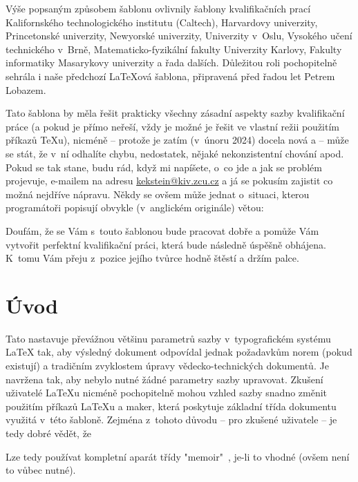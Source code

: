 \documentclass[czech, ma, kiv, he, iso690alph, pdf, viewonly]{fasthesis}
\begin{document}
Výše popsaným způsobem šablonu ovlivnily šablony kvalifikačních prací Kalifornského technologického institutu (Caltech), Harvardovy univerzity, Princetonské univerzity, Newyorské univerzity, Univerzity v~Oslu, Vysokého učení technického v~Brně, Matematicko-fyzikální fakulty Univerzity Karlovy, Fakulty informatiky Masarykovy univerzity a řada dalších. Důležitou roli pochopitelně sehrála i naše předchozí \LaTeX{}ová šablona, připravená před řadou let Petrem Lobazem.

Tato šablona by měla řešit prakticky všechny zásadní aspekty sazby kvalifikační práce (a pokud je přímo neřeší, vždy je možné je řešit ve vlastní režii použitím příkazů \TeX{}u), nicméně -- protože je zatím (v~únoru 2024) docela nová a  -- může se stát, že v~ní odhalíte chybu, nedostatek, nějaké nekonzistentní chování apod. Pokud se tak stane, budu rád, když mi napíšete, o~co jde a jak se problém projevuje, e-mailem na adresu \url{kekstein@kiv.zcu.cz} a já se pokusím zajistit co možná nejdříve nápravu. Někdy se ovšem může jednat o~situaci, kterou programátoři popisují obvykle (v~anglickém originále) větou: 

Doufám, že se Vám s~touto šablonou bude pracovat dobře a pomůže Vám vytvořit perfektní kvalifikační práci, která bude následně úspěšně obhájena. K~tomu Vám přeju z~pozice jejího tvůrce hodně štěstí a držím palce.
%
%
%
%
\chapter{Úvod}
Tato  nastavuje převážnou většinu parametrů sazby v~typografickém systému \LaTeX{} tak, aby výsledný dokument odpovídal jednak požadavkům norem (pokud existují) a tradičním zvyklostem úpravy vědecko-technických dokumentů. Je navržena tak, aby nebylo nutné žádné parametry sazby  upravovat. Zkušení uživatelé \LaTeX{}u nicméně pochopitelně mohou vzhled sazby snadno změnit použitím příkazů \LaTeX{}u a maker, která poskytuje základní třída dokumentu využitá v~této šabloně. Zejména z~tohoto důvodu -- pro zkušené uživatele -- je tedy dobré vědět, že
\begin{center}
\end{center}
Lze tedy používat kompletní aparát třídy \filename"memoir"~\cite{memoir}, je-li to vhodné (ovšem není to vůbec nutné).
\end{document}
